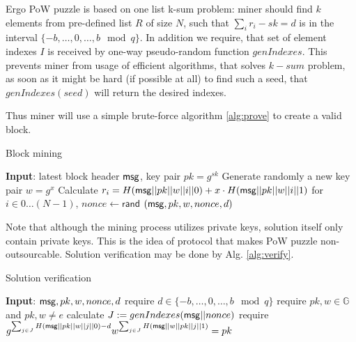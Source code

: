 \documentclass[]{article}
\begin{document}
    Ergo PoW puzzle is based on one list k-sum problem: miner should find
    $k$ elements from pre-defined list $R$ of size $N$, such that
    $\sum_{i} r_{i} - sk = d$ is in the interval $\{-b,\dots,0,\dots,b\mod q\}$.
    In addition we require, that set of element indexes $I$ is received
    by one-way pseudo-random function $genIndexes$. This prevents miner
    from usage of efficient algorithms, that solves $k-sum$ problem, as
    soon as it might be hard (if possible at all) to find such a seed,
    that $genIndexes(seed)$ will return the desired indexes.

    Thus miner will use a simple brute-force algorithm \ref{alg:prove} to
    create a valid block.

    \begin{algorithm}[H]
        \caption{Block mining}
        \label{alg:prove}
        \begin{algorithmic}[1]
            \State \textbf{Input}: latest block header $\mathsf{msg}$, key pair $pk=g^{sk}$
            \State Generate randomly a new key pair $w=g^x$
            \State Calculate $r_i=H(\mathsf{msg}||pk||w||i||0)+x\cdot H(\mathsf{msg}||pk||w||i||1)$ for $i\in 0\dots (N-1)$,
                \State $nonce\leftarrow\mathsf{rand}$
                \State \Return $(\mathsf{msg},pk,w,nonce,d)$
                \EndIf
            \EndWhile
        \end{algorithmic}
    \end{algorithm}

    Note that although the mining process utilizes private keys, solution itself
    only contain private keys. This is the idea of \Name protocol that makes
    PoW puzzle non-outsourcable. Solution verification may be done by Alg. \ref{alg:verify}.

    \begin{algorithm}[H]
        \caption{Solution verification}
        \label{alg:verify}
        \begin{algorithmic}[1]
            \State \textbf{Input}: $\mathsf{msg},pk,w,nonce,d$
            \State require $d\in\{-b,\dots,0,\dots, b\mod q\}$
            \State require $pk,w\in \mathbb{G}$ and $pk,w \ne e$
            \State calculate $J:=genIndexes(\mathsf{msg}||nonce)$
            \State require $g^{\sum_{j \in J} H(\mathsf{msg}||pk||w||j||0) - d}
            w^{\sum_{j \in J} H(\mathsf{msg}||w||pk||j||1)} = pk$
        \end{algorithmic}
    \end{algorithm}
\end{document}
